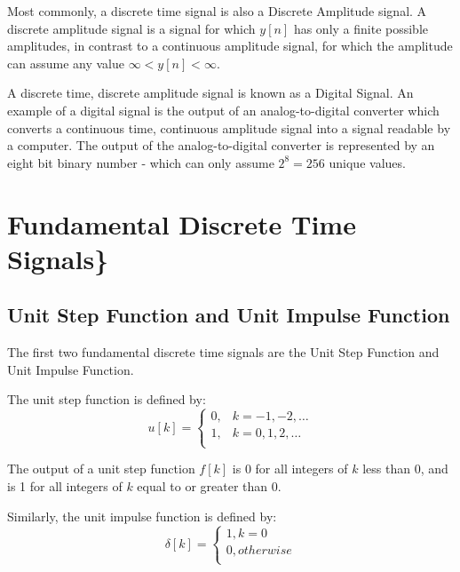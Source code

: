 \documentclass[
]{book}
\theoremstyle{definition}
\theoremstyle{definition}
\theoremstyle{definition}
\theoremstyle{remark}
\begin{document}
Most commonly, a discrete time signal is also a Discrete Amplitude signal. A discrete amplitude signal is a signal for which \(y[n]\) has only a finite possible amplitudes, in contrast to a continuous amplitude signal, for which the amplitude can assume any value \(\infty < y[n] < \infty\).

A discrete time, discrete amplitude signal is known as a Digital Signal. An example of a digital signal is the output of an analog-to-digital converter which converts a continuous time, continuous amplitude signal into a signal readable by a computer. The output of the analog-to-digital converter is represented by an eight bit binary number - which can only assume \(2^8 = 256\) unique values.

\hypertarget{fundamental-discrete-time-signals}{%
\section{Fundamental Discrete Time Signals\}}\label{fundamental-discrete-time-signals}}

\hypertarget{unit-step-function-and-unit-impulse-function}{%
\subsection{Unit Step Function and Unit Impulse Function}\label{unit-step-function-and-unit-impulse-function}}

The first two fundamental discrete time signals are the Unit Step Function and Unit Impulse Function.

The unit step function is defined by:
\begin{equation} \label{unitstepfunction}
u[k] = \begin{cases}
0, & k = -1, -2, \ldots \\
1, & k = 0, 1, 2, \ldots\\
\end{cases}
\end{equation}

The output of a unit step function \(f[k]\) is 0 for all integers of \(k\) less than 0, and is 1 for all integers of \(k\) equal to or greater than 0.

Similarly, the unit impulse function is defined by:
\begin{equation}
\delta[k] = \begin{cases}
1, k = 0 \\
0, otherwise\\
\end{cases}
\end{equation}
\end{document}
